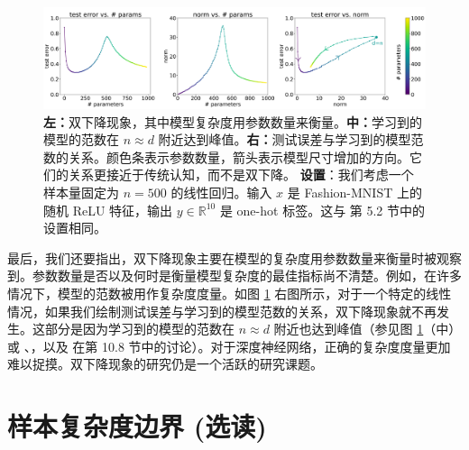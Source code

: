 \begin{figure}[H]
    \centering
    \includegraphics[width=1.0\linewidth]{figs/double_descent_norm.png}
    \caption{\textbf{左：}双下降现象，其中模型复杂度用参数数量来衡量。\textbf{中：}学习到的模型的范数在 $n \approx d$ 附近达到峰值。\textbf{右：}测试误差与学习到的模型范数的关系。颜色条表示参数数量，箭头表示模型尺寸增加的方向。它们的关系更接近于传统认知，而不是双下降。 \textbf{设置}：我们考虑一个样本量固定为 $n = 500$ 的线性回归。输入 $x$ 是 Fashion-MNIST 上的随机 ReLU 特征，输出 $y \in \mathbb{R}^{10}$ 是 one-hot 标签。这与 \cite{nakkiran2020optimal} 第 5.2 节中的设置相同。}
    \label{fig:8.12}
\end{figure}

最后，我们还要指出，双下降现象主要在模型的复杂度用参数数量来衡量时被观察到。参数数量是否以及何时是衡量模型复杂度的最佳指标尚不清楚。例如，在许多情况下，模型的范数被用作复杂度度量。如图 \ref{fig:8.12} 右图所示，对于一个特定的线性情况，如果我们绘制测试误差与学习到的模型范数的关系，双下降现象就不再发生。这部分是因为学习到的模型的范数在 $n \approx d$ 附近也达到峰值（参见图 \ref{fig:8.12}（中）或 \cite{belkin2019reconciling}、\cite{mei2022generalization}，以及 \cite{james2021introduction} 在第 10.8 节中的讨论）。对于深度神经网络，正确的复杂度度量更加难以捉摸。双下降现象的研究仍是一个活跃的研究课题。

\section{样本复杂度边界 (选读)}\label{sec:8.3}


